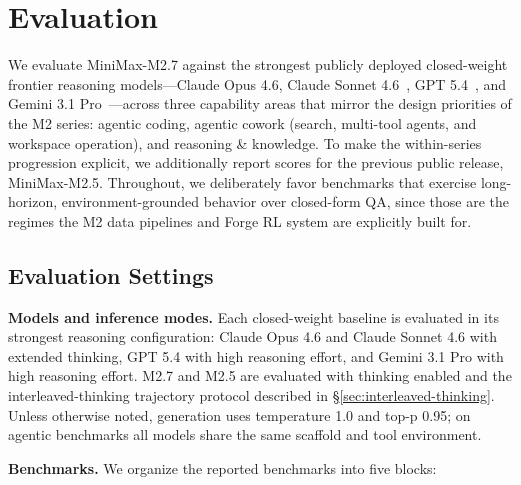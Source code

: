 \section{Evaluation}
\label{sec:eval}

We evaluate MiniMax-M2.7 against the strongest publicly deployed closed-weight frontier reasoning models---Claude Opus 4.6, Claude Sonnet 4.6~\citep{anthropic2025claude46}, GPT 5.4~\citep{openai2025gpt5}, and Gemini 3.1 Pro~\citep{google2025gemini31}---across three capability areas that mirror the design priorities of the M2 series: agentic coding, agentic cowork (search, multi-tool agents, and workspace operation), and reasoning \& knowledge. To make the within-series progression explicit, we additionally report scores for the previous public release, MiniMax-M2.5. Throughout, we deliberately favor benchmarks that exercise long-horizon, environment-grounded behavior over closed-form QA, since those are the regimes the M2 data pipelines and Forge RL system are explicitly built for.

\subsection{Evaluation Settings}

\noindent \textbf{Models and inference modes.} Each closed-weight baseline is evaluated in its strongest reasoning configuration: Claude Opus 4.6 and Claude Sonnet 4.6 with extended thinking, GPT 5.4 with high reasoning effort, and Gemini 3.1 Pro with high reasoning effort. M2.7 and M2.5 are evaluated with thinking enabled and the interleaved-thinking trajectory protocol described in \S\ref{sec:interleaved-thinking}. Unless otherwise noted, generation uses temperature 1.0 and top-p 0.95; on agentic benchmarks all models share the same scaffold and tool environment.

\noindent \textbf{Benchmarks.} We organize the reported benchmarks into five blocks:

